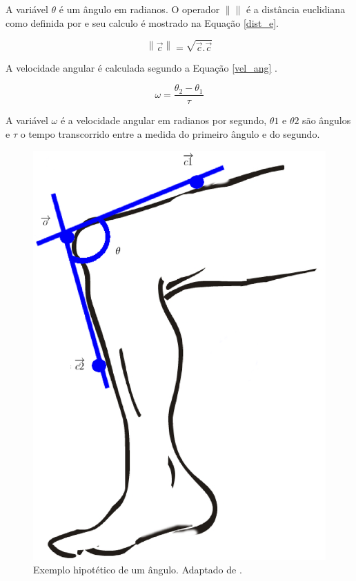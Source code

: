 A variável $\theta$ é um ângulo em radianos.
O operador  $\left \| \right \|$ é a distância euclidiana como definida por  e seu calculo é mostrado na Equação \ref{dist_e}.

\begin{equation}
	\label{dist_e}
	  \left \| \overrightarrow{c} \right \|  =  \sqrt{\overrightarrow{c} . \overrightarrow{c}}
\end{equation}

A velocidade angular é calculada segundo a Equação \ref{vel_ang} .


\begin{equation}
	\label{vel_ang}
	\omega =  \frac{\theta_2 - \theta_1}{\tau}
\end{equation}

A variável $\omega$ é a velocidade angular em radianos por segundo, $\theta1$ e $\theta2$ são ângulos e $\tau$ o tempo transcorrido entre a medida do primeiro ângulo e do segundo.

\begin{figure}[ht]
	\centering
	\includegraphics[width=14cm]{figuras/leg.eps}
	\caption{Exemplo hipotético de um ângulo. Adaptado de \cite{Cliparts2015}.}
	\label{leg}
\end{figure}


